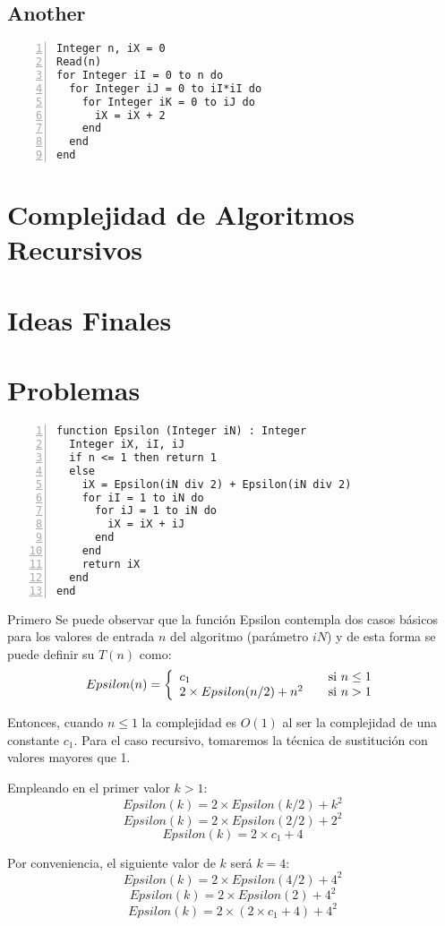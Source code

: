 \subsection{Another}
\begin{lstlisting}[upquote=true, language=pseudo, numbers=left]
Integer n, iX = 0
Read(n)
for Integer iI = 0 to n do
  for Integer iJ = 0 to iI*iI do
    for Integer iK = 0 to iJ do
      iX = iX + 2
    end
  end
end
\end{lstlisting}

\section{Complejidad de Algoritmos Recursivos}

\section{Ideas Finales}

\section{Problemas}
\begin{lstlisting}[upquote=true, language=pseudo, numbers=left]
function Epsilon (Integer iN) : Integer
  Integer iX, iI, iJ
  if n <= 1 then return 1
  else
    iX = Epsilon(iN div 2) + Epsilon(iN div 2)
    for iI = 1 to iN do
      for iJ = 1 to iN do
        iX = iX + iJ
      end
    end
    return iX
  end
end
\end{lstlisting}

Primero
Se puede observar que la función Epsilon contempla dos casos básicos para los valores de entrada $n$ del algoritmo (parámetro $iN$) y de esta forma se puede definir su $T(n)$ como:
\begin{equation}
Epsilon(n) = \left\{
  \begin{array}{l l}
    c_1 & \quad \text{si $n \le 1$}\\
    2 \times Epsilon(n/2) + n^2& \quad \text{si $n > 1$}
  \end{array} \right.
\end{equation}

Entonces, cuando $n \le 1$ la complejidad es $O(1)$ al ser la complejidad de una constante $c_1$. Para el caso recursivo, tomaremos la técnica de sustitución con valores mayores que 1.

Empleando en el primer valor $k > 1$:
$$Epsilon(k) = 2 \times Epsilon(k/2) + k^2$$
$$Epsilon(k) = 2 \times Epsilon(2/2) + 2^2$$
$$Epsilon(k) = 2 \times c_1 + 4$$

Por conveniencia, el siguiente valor de $k$ será $k=4$:
$$Epsilon(k) = 2 \times Epsilon(4/2) + 4^2$$
$$Epsilon(k) = 2 \times Epsilon(2) + 4^2$$
 $$Epsilon(k) = 2 \times (2 \times c_1 + 4) + 4^2$$
